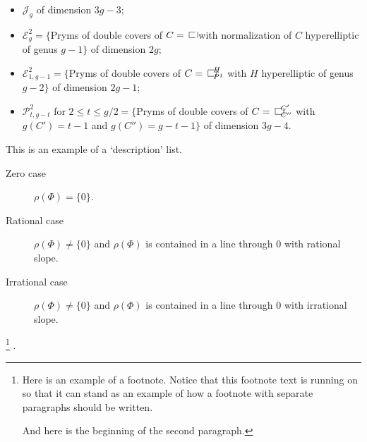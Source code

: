 \begin{itemize}
\item $\mathcal{J}_g$ of dimension $3g-3$;
\item $\mathcal{E}^2_g=\{$Pryms of double covers of $C=\openbox$ with
normalization of $C$ hyperelliptic of genus $g-1\}$ of dimension $2g$;
\item $\mathcal{E}^2_{1,g-1}=\{$Pryms of double covers of
$C=\openbox^H_{P^1}$ with $H$ hyperelliptic of genus $g-2\}$ of
dimension $2g-1$;
\item $\mathcal{P}^2_{t,g-t}$ for $2\le t\le g/2=\{$Pryms of double
covers of $C=\openbox^{C'}_{C''}$ with $g(C')=t-1$ and $g(C'')=g-t-1\}$
of dimension $3g-4$.
\end{itemize}


  This is an example of a `description' list.

\begin{description}
\item[Zero case] $\rho(\Phi) = \{0\}$.

\item[Rational case] $\rho(\Phi) \ne \{0\}$ and $\rho(\Phi)$ is
contained in a line through $0$ with rational slope.

\item[Irrational case] $\rho(\Phi) \ne \{0\}$ and $\rho(\Phi)$ is
contained in a line through $0$ with irrational slope.
\end{description}
\footnote{Here is an example of a footnote. Notice that this footnote
text is running on so that it can stand as an example of how a footnote
with separate paragraphs should be written.
\par
And here is the beginning of the second paragraph.}%
.




